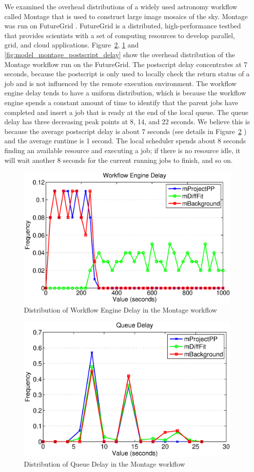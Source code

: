 We examined the overhead distributions of a widely used astronomy workflow called Montage \cite{Berriman2004} that is used to construct large image mosaics of the sky. Montage was run on FutureGrid \cite{Fox2013FutureGrid}. FutureGrid is a distributed, high-performance testbed that provides scientists with a set of computing resources to develop parallel, grid, and cloud applications. 
Figure~\ref{fig:model_montage_queue_delay}, \ref{fig:model_montage_engine_delay} and \ref{fig:model_montage_postscript_delay} show the overhead distribution of the Montage workflow run on the FutureGrid. The postscript delay concentrates at 7 seconds, because the postscript is only used to locally check the return status of a job and is not influenced by the remote execution environment. The workflow engine delay tends to have a uniform distribution, which is because the workflow engine spends a constant amount of time to identify that the parent jobs have completed and insert a job that is ready at the end of the local queue. 
The queue delay has three decreasing peak points at 8, 14, and 22 seconds. We believe this is because the average postscript delay is about 7 seconds (see details in Figure~\ref{fig:model_montage_queue_delay} ) and the average runtime is 1 second. The local scheduler spends about 8 seconds finding an available resource and executing a job; if there is no resource idle, it will wait another 8 seconds for the current running jobs to finish, and so on. 


\begin{figure}[h!]
	\centering
    \includegraphics[height=0.4\textwidth]{figures/model/workflow_engine_delay.eps}
    \caption{Distribution of Workflow Engine Delay in the Montage workflow}
    \label{fig:model_montage_engine_delay}
\end{figure}

\begin{figure}[h!]
	\centering
\includegraphics[height=0.4\textwidth]{figures/model/queue_delay.eps}
    \caption{Distribution of Queue Delay in the Montage workflow}
    \label{fig:model_montage_queue_delay}
\end{figure}

